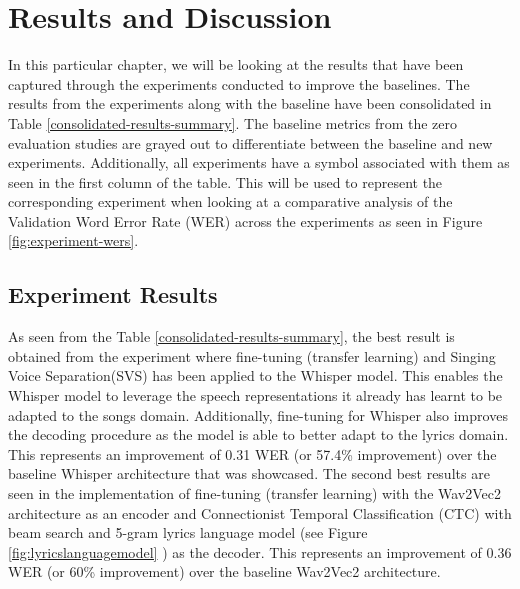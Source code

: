 
\chapter{Results and Discussion}%
\label{sec:results}

In this particular chapter, we will be looking at the results that have been captured through the experiments conducted to improve the baselines. The results from the experiments along with the baseline have been consolidated in Table \ref{consolidated-results-summary}. The baseline metrics from the zero evaluation studies are grayed out to differentiate between the baseline and new experiments. Additionally, all experiments have a symbol associated with them as seen in the first column of the table. This will be used to represent the corresponding experiment when looking at a comparative analysis of the Validation Word Error Rate (WER) across the experiments as seen in Figure \ref{fig:experiment-wers}.

\section{Experiment Results}%
\label{sec:results}

As seen from the Table \ref{consolidated-results-summary}, the best result is obtained from the experiment where fine-tuning (transfer learning) and Singing Voice Separation(SVS) has been applied to the Whisper model. This enables the Whisper model to leverage the speech representations it already has learnt to be adapted to the songs domain. Additionally, fine-tuning for Whisper also improves the decoding procedure as the model is able to better adapt to the lyrics domain. This represents an improvement of 0.31 WER (or 57.4\% improvement) over the baseline Whisper architecture that was showcased. The second best results are seen in the implementation of fine-tuning (transfer learning) with the Wav2Vec2 architecture as an encoder and Connectionist Temporal Classification (CTC) with beam search and 5-gram lyrics language model (see Figure \ref{fig:lyricslanguagemodel} ) as the decoder. This represents an improvement of 0.36 WER (or 60\% improvement) over the baseline Wav2Vec2 architecture.


